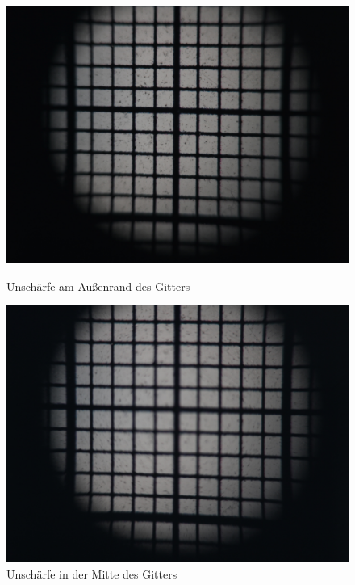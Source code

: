 \begin{figure}[htb]
	\begin{minipage}[t]{0.48\textwidth}
		\includegraphics[width=\linewidth]{img/Bildwoelbung/Prakt_Linsenfehler_2015_06_04_074}
		\caption{Unschärfe am Außenrand des Gitters}
		\label{fig:bildwoelbung_aussen}
	\end{minipage}
	\hfill
	\begin{minipage}[t]{0.48\textwidth}
		\includegraphics[width=\linewidth]{img/Bildwoelbung/Prakt_Linsenfehler_2015_06_04_075}
		\caption{Unschärfe in der Mitte des Gitters}
		\label{fig:bildwoelbung_mitte}
	\end{minipage}
\end{figure}

